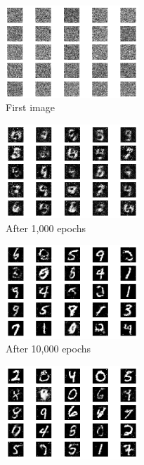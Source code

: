 \documentclass[a4paper]{article}    %
\begin{document}
\begin{figure}[H]
    \centering
    \begin{subfigure}{0.32\textwidth}
        \centering
        \includegraphics[width=5cm]{0}
        \caption{First image}
        \label{fig:mnist-epoch0}
    \end{subfigure}
    \hfill
    \begin{subfigure}{0.32\textwidth}
        \centering
        \includegraphics[width=5cm]{1000}
        \caption{After 1,000 epochs}
        \label{fig:mnist-epoch1000}
    \end{subfigure}
    \hfill
    \begin{subfigure}{0.32\textwidth}
        \centering
        \includegraphics[width=5cm]{10000}
        \caption{After 10,000 epochs}
        \label{fig:mnist-epoch10000}
    \end{subfigure}
    \hfill
    \begin{subfigure}{0.32\textwidth}
        \centering
        \includegraphics[width=5cm]{20000}

\end{subfigure}
\end{figure}
\end{document}
